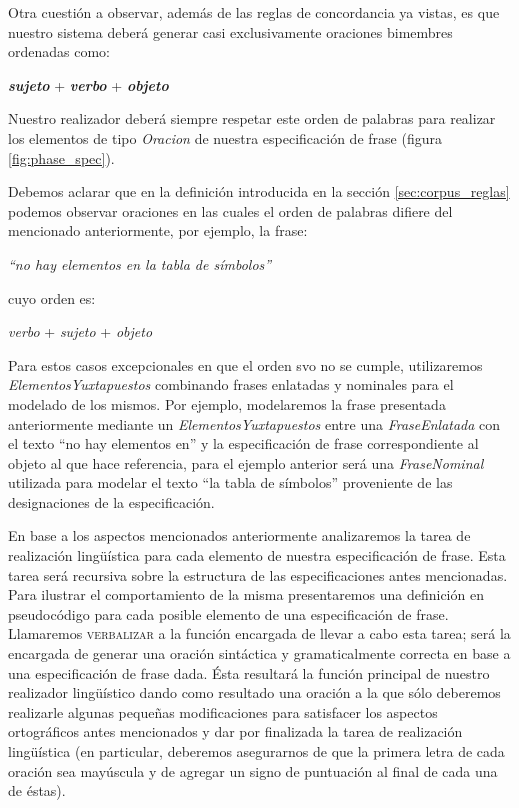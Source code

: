 \bigskip
Otra cuestión a observar, además de las reglas de concordancia ya vistas, es que nuestro sistema deberá generar casi exclusivamente oraciones bimembres ordenadas como:

\begin{center}
\emph{\textbf{sujeto}} + \emph{\textbf{verbo}} + \emph{\textbf{objeto}}
\end{center}

\noindent
Nuestro realizador deberá siempre respetar este orden de palabras para realizar los elementos de tipo \emph{Oracion} de nuestra especificación de frase (figura \ref{fig:phase_spec}). 

Debemos aclarar que en la definición introducida en la sección \ref{sec:corpus_reglas} podemos observar oraciones en las cuales el orden de palabras difiere del mencionado anteriormente, por ejemplo, la frase:

\begin{center}
\emph{``no hay elementos en la tabla de símbolos''}
\end{center}

\noindent
cuyo orden es: 

\begin{center}
\emph{verbo} + \emph{sujeto} + \emph{objeto}
\end{center}

Para estos casos excepcionales en que el orden svo no se cumple, utilizaremos \textit{ElementosYuxtapuestos} combinando frases enlatadas y nominales para el modelado de los mismos. Por ejemplo, modelaremos la frase presentada anteriormente mediante un \emph{ElementosYuxtapuestos} entre una \emph{FraseEnlatada} con el texto ``no hay elementos en'' y la especificación de frase correspondiente al objeto al que hace referencia, para el ejemplo anterior será una \emph{FraseNominal} utilizada para modelar el texto ``la tabla de símbolos'' proveniente de las designaciones de la especificación.


\bigskip
En base a los aspectos mencionados anteriormente analizaremos la tarea de realización lingüística para cada elemento de nuestra especificación de frase. Esta tarea será recursiva sobre la estructura de las especificaciones antes mencionadas. Para ilustrar el comportamiento de la misma presentaremos una definición en pseudocódigo para cada posible elemento de una especificación de frase. Llamaremos \textsc{verbalizar} a la función encargada de llevar a cabo esta tarea; será la encargada de generar una oración sintáctica y gramaticalmente correcta  en base a una especificación de frase dada. Ésta resultará la función principal de nuestro realizador lingüístico dando como resultado una oración a la que sólo deberemos realizarle algunas pequeñas modificaciones para satisfacer los aspectos ortográficos antes mencionados y dar por finalizada la tarea de realización lingüística (en particular, deberemos asegurarnos de que la primera letra de cada oración sea mayúscula y de agregar un signo de puntuación al final de cada una de éstas).

